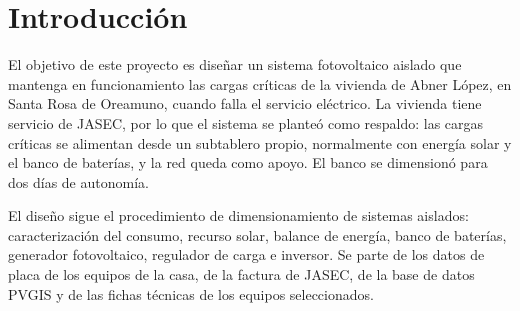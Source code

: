 \section{Introducción}

El objetivo de este proyecto es diseñar un sistema fotovoltaico aislado que mantenga en funcionamiento las cargas críticas de la vivienda de Abner López, en Santa Rosa de Oreamuno, cuando falla el servicio eléctrico. La vivienda tiene servicio de JASEC, por lo que el sistema se planteó como respaldo: las cargas críticas se alimentan desde un subtablero propio, normalmente con energía solar y el banco de baterías, y la red queda como apoyo. El banco se dimensionó para dos días de autonomía.

El diseño sigue el procedimiento de dimensionamiento de sistemas aislados: caracterización del consumo, recurso solar, balance de energía, banco de baterías, generador fotovoltaico, regulador de carga e inversor. Se parte de los datos de placa de los equipos de la casa, de la factura de JASEC, de la base de datos PVGIS y de las fichas técnicas de los equipos seleccionados.
